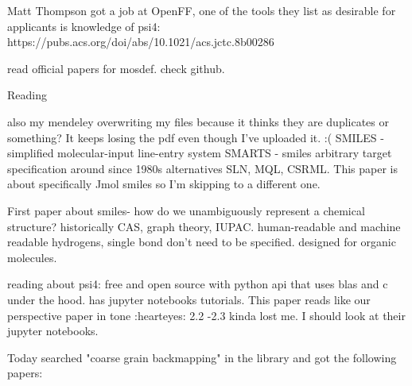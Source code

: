 \documentclass{article}
\begin{document}
Matt Thompson got a job at OpenFF, one of the tools they list as desirable for applicants is knowledge of psi4:
https://pubs.acs.org/doi/abs/10.1021/acs.jctc.8b00286

read official papers for mosdef. check github.

Reading 

\cite{Hanson2016} 

also my mendeley overwriting my files because it thinks they are duplicates or something? It keeps losing the pdf even though I've uploaded it. :(
SMILES - simplified molecular-input line-entry system
SMARTS - smiles arbitrary target specification
around since 1980s
alternatives SLN, MQL, CSRML.
This paper is about specifically Jmol smiles so I'm skipping to a different one.

\cite{Weininger1988} 

First paper about smiles- how do we unambiguously represent a chemical structure? historically CAS, graph theory, IUPAC.
human-readable and machine readable
hydrogens, single bond don't need to be specified. designed for organic molecules.

\cite{Smith2018} 

reading about psi4: free and open source with python api that uses blas and c under the hood. has jupyter notebooks tutorials. This paper reads like our perspective paper in tone :hearteyes: 2.2 -2.3 kinda lost me. I should look at their jupyter notebooks.

Today searched "coarse grain backmapping" in the library and got the following papers:

\cite{Alessandri2017b}
\end{document}
